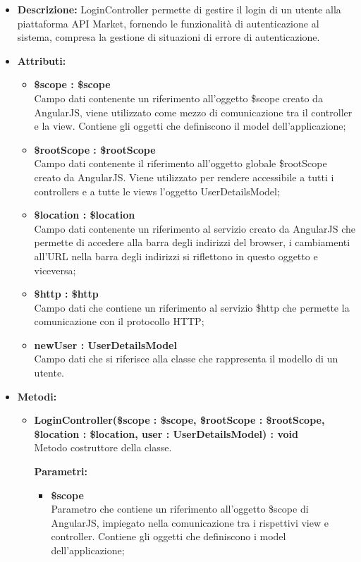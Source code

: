 \begin{itemize}
	\item \textbf{Descrizione:} LoginController permette di gestire il login di un utente alla piattaforma
API Market, fornendo le funzionalità di autenticazione al sistema, compresa la gestione di situazioni di errore di autenticazione.
	\item \textbf{Attributi:}
		\begin{itemize}
		
			\item \textbf{\$scope : \$scope}\\
			Campo dati contenente un riferimento all'oggetto \$scope creato da AngularJS, viene utilizzato come mezzo di comunicazione tra il controller e la view. Contiene gli oggetti che definiscono il model dell'applicazione;
			
			\item \textbf{\$rootScope : \$rootScope}\\
			Campo dati contenente il riferimento all'oggetto globale \$rootScope creato da AngularJS. Viene utilizzato per rendere accessibile a tutti i controllers e a tutte le views l'oggetto UserDetailsModel;
			
			\item \textbf{\$location : \$location}\\
			Campo dati contenente un riferimento al servizio creato da AngularJS che permette di accedere alla barra degli indirizzi del browser, i cambiamenti all'URL nella barra degli indirizzi si riflettono in questo oggetto e viceversa;

			\item \textbf{\$http : \$http }\\
			Campo dati che contiene un riferimento al servizio \$http che permette la comunicazione con il protocollo HTTP;
				
			\item \textbf{newUser : UserDetailsModel }\\
			Campo dati che si riferisce alla classe che rappresenta il modello di un utente.
				
		\end{itemize}
	\item \textbf{Metodi:}
		\begin{itemize}
		
			\item \textbf{LoginController(\$scope : \$scope, \$rootScope : \$rootScope, \$location : \$location, user : UserDetailsModel) : void}\\
			Metodo costruttore della classe.
			\begin{description}
    			\item[\textbf{Parametri:}]
			\end{description}
			\begin{itemize}
				\item \textbf{\$scope}\\
				Parametro che contiene un riferimento all'oggetto \$scope di AngularJS, impiegato nella comunicazione tra i rispettivi view e controller. Contiene gli oggetti che definiscono i model dell'applicazione;
				

\end{itemize}
\end{itemize}
\end{itemize}
